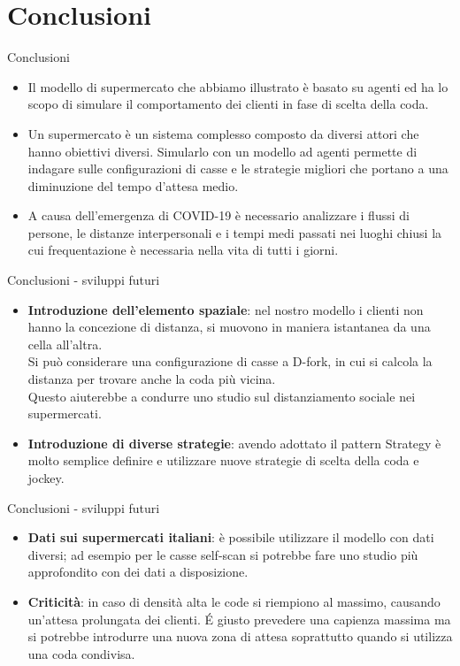 \section{Conclusioni}
\begin{frame}{Conclusioni}
	\begin{itemize}
		\item Il modello di supermercato che abbiamo illustrato è basato su agenti ed ha lo scopo di simulare il comportamento dei clienti in fase di scelta della coda.
		\item Un supermercato è un sistema complesso composto da diversi attori che hanno obiettivi diversi. Simularlo con un modello ad agenti permette di indagare sulle configurazioni di casse e le strategie migliori che portano a una diminuzione del tempo d'attesa medio.
		\item A causa dell'emergenza di COVID-19 è necessario analizzare i flussi di persone, le distanze interpersonali e i tempi medi passati nei luoghi chiusi la cui frequentazione è necessaria nella vita di tutti i giorni.
	\end{itemize}
\end{frame}

\begin{frame}{Conclusioni - sviluppi futuri}
	\begin{itemize}
		\item \textbf{Introduzione dell'elemento spaziale}: nel nostro modello i clienti non hanno la concezione di distanza, si muovono in maniera istantanea da una cella all'altra. \\
		Si può considerare una configurazione di casse a D-fork, in cui si calcola la distanza per trovare anche la coda più vicina. \\
		Questo aiuterebbe a condurre uno studio sul distanziamento sociale nei supermercati.
		\item \textbf{Introduzione di diverse strategie}: avendo adottato il pattern Strategy è molto semplice definire e utilizzare nuove strategie di scelta della coda e jockey.
	\end{itemize}
\end{frame}

\begin{frame}{Conclusioni - sviluppi futuri}
	\begin{itemize}
		\item \textbf{Dati sui supermercati italiani}: è possibile utilizzare il modello con dati diversi; ad esempio per le casse self-scan si potrebbe fare uno studio più approfondito con dei dati a disposizione.
		\item \textbf{Criticità}: in caso di densità alta le code si riempiono al massimo, causando un'attesa prolungata dei clienti. \'E giusto prevedere una capienza massima ma si potrebbe introdurre una nuova zona di attesa soprattutto quando si utilizza una coda condivisa.
	\end{itemize}
\end{frame}